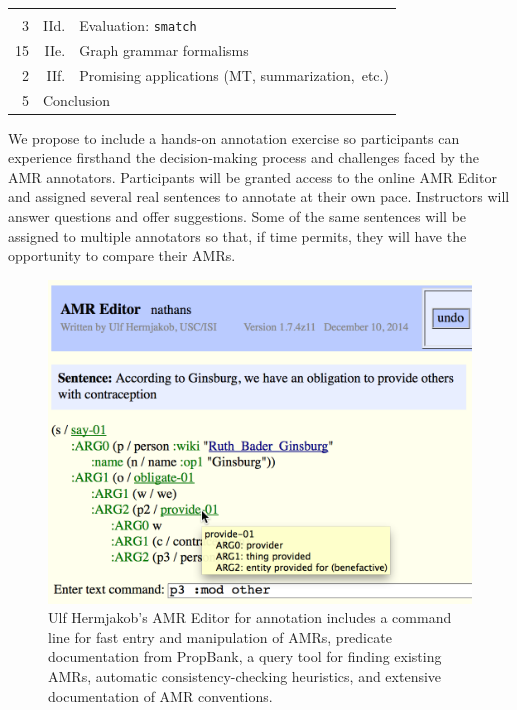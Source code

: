 \documentclass[11pt,letterpaper]{article}
\begin{document}
\begin{center}
\begin{tabular}{@{}r@{~~}|r@{~}p{19em}|@{}}
{{\begin{itemize}
\end{itemize}}} \\
 3 & IId. & Evaluation: \texttt{smatch} \citep{cai-13} \\
 15 & IIe. & Graph grammar formalisms \citep{quernheim-12,chiang-13,braune-14} \\
 2 & IIf. & Promising applications (MT, summarization,~etc.) \\
 5 & \multicolumn{2}{l|}{Conclusion}\\
\cline{2-3}
\end{tabular}
\end{center}

We propose to include a hands-on annotation exercise 
so participants can experience firsthand the decision-making process 
and challenges faced by the AMR annotators. 
Participants will be granted access to the online AMR Editor 
and assigned several real sentences to annotate at their own pace. 
Instructors will answer questions and offer suggestions.
Some of the same sentences will be assigned to multiple annotators so that,
if time permits, they will have the opportunity to compare their AMRs. 

\begin{figure}\centering
\includegraphics[width=\columnwidth]{editor_zoomed.png}
\caption{Ulf Hermjakob's AMR Editor for annotation includes a command line for fast entry and manipulation of AMRs, 
predicate documentation from PropBank, a query tool for finding existing AMRs, automatic consistency-checking heuristics, 
and extensive documentation of AMR conventions.}
\label{fig:editor}
\end{figure}
\end{document}
